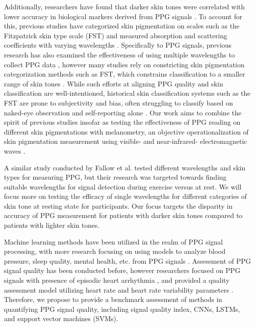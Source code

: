 \documentclass[letterpaper, 10 pt, conference]{ieeeconf}  %
\begin{document}
Additionally, researchers have found that darker skin tones were correlated with lower accuracy in biological markers derived from PPG signals \cite{al-halawani_review_2023}\cite{bent_investigating_2020}. To account for this, previous studies have categorized skin pigmentation on scales such as the Fitzpatrick skin type scale (FST) and measured absorption and scattering coefficients with varying wavelengths \cite{setchfield_effect_2024}. Specifically to PPG signals, previous research has also examined the effectiveness of using multiple wavelengths to collect PPG data \cite{ray_review_2023}, however many studies rely on constricting skin pigmentation categorization methods such as FST, which constrains classification to a smaller range of skin tones \cite{okoji_equity_2021}. While such efforts at aligning PPG quality and skin classification are well-intentioned, historical skin classification systems such as the FST are prone to subjectivity and bias, often struggling to classify based on naked-eye observation and self-reporting alone \cite{fitzpatrick_validity_1988}. Our work aims to combine the spirit of previous studies insofar as testing the effectiveness of PPG reading on different skin pigmentations with melanometry, an objective operationalization of skin pigmentation measurement using visible- and near-infrared- electromagnetic waves \cite{vasudevan_melanometry_2024}. 

A similar study conducted by Fallow et al. tested different wavelengths and skin types for measuring PPG, but their research was targeted towards finding suitable wavelengths for signal detection during exercise versus at rest. We will focus more on testing the efficacy of single wavelengths for different categories of skin tone at resting state for participants. Our focus targets the disparity in accuracy of PPG measurement for patients with darker skin tones compared to patients with lighter skin tones.

Machine learning methods have been utilized in the realm of PPG signal processing, with more research focusing on using models to analyze blood pressure, sleep quality, mental health, etc. from PPG signals \cite{nie_review_2024}\cite{gonzalez_benchmark_2023}. Assessment of PPG signal quality has been conducted before, however researchers focused on PPG signals with presence of episodic heart arrhythmia \cite{pereira_deep_2019}, and provided a quality assessment model utilizing heart rate and heart rate variability parameters \cite{naeini_deep_2023}. Therefore, we propose to provide a benchmark assessment of methods in quantifying PPG signal quality, including signal quality index, CNNs, LSTMs, and support vector machines (SVMs).
\end{document}
